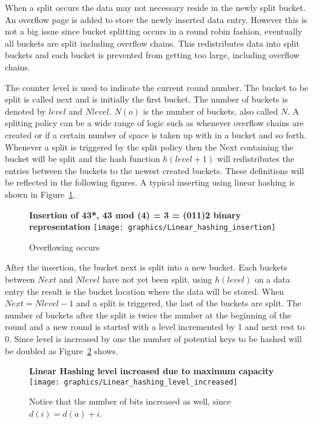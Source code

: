 \documentclass[letterpaper, 12pt]{article}
\begin{document}
When a split occurs the data may not necessary reside in the newly split bucket. An overflow page is
added to store the newly inserted data entry. However this is not a big issue since bucket splitting
occurs in a round robin fashion, eventually all buckets are split including overflow chains.
This redistributes data into split buckets and each bucket is prevented from getting too large,
including overflow chains.
\par\vspace{\baselineskip}
The counter level is used to indicate the current round number. The bucket to be split is called
next and is initially the first bucket. The number of buckets is denoted by $level$ and $Nlevel$.
$N(o)$ is the number of buckets, also called $N$. A spliting policy can be a wide range of logic
such as whenever overflow chains are created or if a certain number of space is taken up with
in a bucket and so forth. Whenever a split is triggered by the split policy then the Next containing
the bucket will be split and the hash function $h(level+1)$ will redistributes the entries
between the buckets to the newest created buckets. These definitions will be reflected in the following
figures. A typical inserting using linear hashing is shown in Figure~\ref{fig:linear_hash_insert}.
\par\vspace{\baselineskip}

\begin{figure}
  \centering
  \textbf{Insertion of 43*, 43 mod (4) = 3 = (011)2 binary representation}
  \texttt{[image: graphics/Linear\_hashing\_insertion]}
  \cite{ramakrishnan2000database}
  \caption{Overflowing occurs}
  \label{fig:linear_hash_insert}
\end{figure}

After the insertion, the bucket next is split into a new bucket. Each buckets between $Next$ and $Nlevel$ have not yet been split,
using $h(level)$ on a data entry the result is the bucket location where the data will be stored.
When $Next = Nlevel - 1$ and a split is triggered, the last of the buckets are split. The 
number of buckets after the split is twice the number at the beginning of the round and a new round is 
started with a level incremented by 1 and next rest to 0. Since level is increased by one the number 
of potential keys to be hashed will be doubled as Figure~\ref{fig:linear_hash_level_inc} shows.
\par\vspace{\baselineskip}
\begin{figure}
  \centering
  \textbf{Linear Hashing level increased due to maximum capacity}
  \texttt{[image: graphics/Linear\_hashing\_level\_increased]}
  \cite{ramakrishnan2000database}
  \caption{Notice that the number of bits increased as well, since $d(i) = d(a) + i$.}
  \label{fig:linear_hash_level_inc}
\end{figure}
\end{document}
